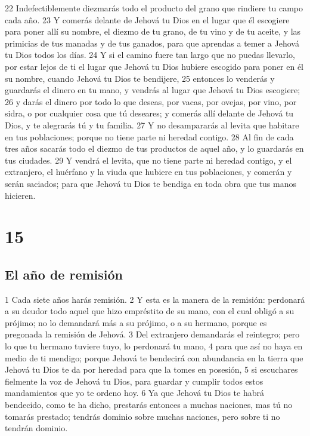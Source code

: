22 Indefectiblemente diezmarás  todo el producto del grano que rindiere tu campo cada año.
23 Y comerás delante de Jehová tu Dios en el lugar que él escogiere para poner allí su nombre, el diezmo de tu grano, de tu vino y de tu aceite, y las primicias de tus manadas y de tus ganados, para que aprendas a temer a Jehová tu Dios todos los días.
24 Y si el camino fuere tan largo que no puedas llevarlo, por estar lejos de ti el lugar que Jehová tu Dios hubiere escogido para poner en él su nombre, cuando Jehová tu Dios te bendijere,
25 entonces lo venderás y guardarás el dinero en tu mano, y vendrás al lugar que Jehová tu Dios escogiere;
26 y darás el dinero por todo lo que deseas, por vacas, por ovejas, por vino, por sidra, o por cualquier cosa que tú deseares; y comerás allí delante de Jehová tu Dios, y te alegrarás tú y tu familia.
27 Y no desampararás al levita que habitare en tus poblaciones; porque no tiene parte ni heredad contigo.
28 Al fin de cada tres años sacarás todo el diezmo de tus productos de aquel año, y lo guardarás en tus ciudades.
29 Y vendrá el levita, que no tiene parte ni heredad contigo, y el extranjero, el huérfano y la viuda que hubiere en tus poblaciones, y comerán y serán saciados; para que Jehová tu Dios te bendiga en toda obra que tus manos hicieren.

\chapter{15}


\section{El año de remisión}


1 Cada siete años harás remisión.
2 Y esta es la manera de la remisión: perdonará a su deudor todo aquel que hizo empréstito de su mano, con el cual obligó a su prójimo; no lo demandará más a su prójimo, o a su hermano, porque es pregonada la remisión de Jehová.
3 Del extranjero demandarás el reintegro; pero lo que tu hermano tuviere tuyo, lo perdonará tu mano,
4 para que así no haya en medio de ti mendigo; porque Jehová te bendecirá con abundancia en la tierra que Jehová tu Dios te da por heredad para que la tomes en posesión,
5 si escuchares fielmente la voz de Jehová tu Dios, para guardar y cumplir todos estos mandamientos que yo te ordeno hoy.
6 Ya que Jehová tu Dios te habrá bendecido, como te ha dicho, prestarás entonces a muchas naciones, mas tú no tomarás prestado; tendrás dominio sobre muchas naciones, pero sobre ti no tendrán dominio. 

